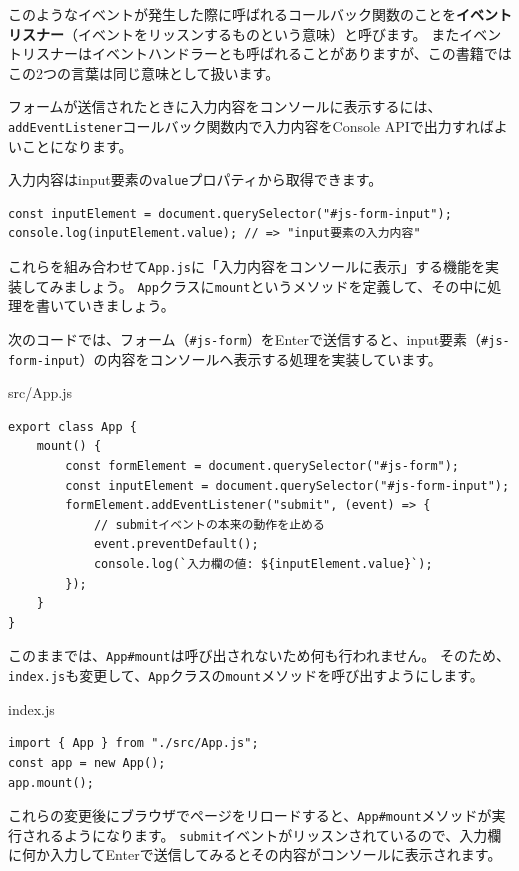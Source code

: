 このようなイベントが発生した際に呼ばれるコールバック関数のことを\textbf{イベントリスナー}（イベントをリッスンするものという意味）と呼びます。
またイベントリスナーはイベントハンドラーとも呼ばれることがありますが、この書籍ではこの2つの言葉は同じ意味として扱います。

フォームが送信されたときに入力内容をコンソールに表示するには、
\texttt{addEventListener}コールバック関数内で入力内容をConsole
APIで出力すればよいことになります。

入力内容はinput要素の\texttt{value}プロパティから取得できます。

\begin{lstlisting}
const inputElement = document.querySelector("#js-form-input");
console.log(inputElement.value); // => "input要素の入力内容"
\end{lstlisting}

これらを組み合わせて\texttt{App.js}に「入力内容をコンソールに表示」する機能を実装してみましょう。
\texttt{App}クラスに\texttt{mount}というメソッドを定義して、その中に処理を書いていきましょう。

次のコードでは、フォーム（\texttt{\#js-form}）をEnterで送信すると、input要素（\texttt{\#js-form-input}）の内容をコンソールへ表示する処理を実装しています。

\begin{listtitle}
src/App.js
\end{listtitle}
\begin{lstlisting}
export class App {
    mount() {
        const formElement = document.querySelector("#js-form");
        const inputElement = document.querySelector("#js-form-input");
        formElement.addEventListener("submit", (event) => {
            // submitイベントの本来の動作を止める
            event.preventDefault();
            console.log(`入力欄の値: ${inputElement.value}`);
        });
    }
}
\end{lstlisting}
\listend

このままでは、\texttt{App\#mount}は呼び出されないため何も行われません。
そのため、\texttt{index.js}も変更して、\texttt{App}クラスの\texttt{mount}メソッドを呼び出すようにします。

\begin{listtitle}
index.js
\end{listtitle}
\begin{lstlisting}
import { App } from "./src/App.js";
const app = new App();
app.mount();
\end{lstlisting}
\listend

これらの変更後にブラウザでページをリロードすると、\texttt{App\#mount}メソッドが実行されるようになります。
\texttt{submit}イベントがリッスンされているので、入力欄に何か入力してEnterで送信してみるとその内容がコンソールに表示されます。


